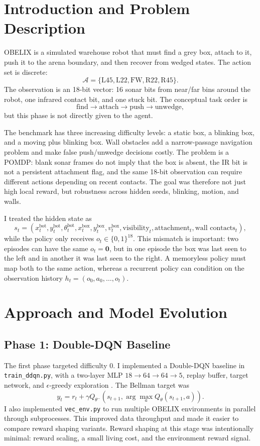 \documentclass[11pt, oneside]{article}
\begin{document}
\section{Introduction and Problem Description}
OBELIX is a simulated warehouse robot that must find a grey box, attach to it, push it to the arena boundary, and then recover from wedged states. The action set is discrete:
\[
\mathcal{A}=\{\text{L45},\text{L22},\text{FW},\text{R22},\text{R45}\}.
\]
The observation is an 18-bit vector: 16 sonar bits from near/far bins around the robot, one infrared contact bit, and one stuck bit. The conceptual task order is
\[
\text{find}\rightarrow \text{attach}\rightarrow \text{push}\rightarrow \text{unwedge},
\]
but this phase is not directly given to the agent.

The benchmark has three increasing difficulty levels: a static box, a blinking box, and a moving plus blinking box. Wall obstacles add a narrow-passage navigation problem and make false push/unwedge decisions costly. The problem is a POMDP: blank sonar frames do not imply that the box is absent, the IR bit is not a persistent attachment flag, and the same 18-bit observation can require different actions depending on recent contacts. The goal was therefore not just high local reward, but robustness across hidden seeds, blinking, motion, and walls.

I treated the hidden state as
\[
s_t=(x_t^{\mathrm{bot}},y_t^{\mathrm{bot}},\theta_t^{\mathrm{bot}},
x_t^{\mathrm{box}},y_t^{\mathrm{box}},v_t^{\mathrm{box}},
\text{visibility}_t,\text{attachment}_t,\text{wall contacts}_t),
\]
while the policy only receives \(o_t\in\{0,1\}^{18}\). This mismatch is important: two episodes can have the same \(o_t=\mathbf{0}\), but in one episode the box was last seen to the left and in another it was last seen to the right. A memoryless policy must map both to the same action, whereas a recurrent policy can condition on the observation history \(h_t=(o_0,a_0,\ldots,o_t)\).

\section{Approach and Model Evolution}
\subsection*{Phase 1: Double-DQN Baseline}
The first phase targeted difficulty 0. I implemented a Double-DQN baseline in \texttt{train\_ddqn.py}, with a two-layer MLP \(18\!\to\!64\!\to\!64\!\to\!5\), replay buffer, target network, and \(\epsilon\)-greedy exploration \citep{mnih2015dqn,vanhasselt2016double}. The Bellman target was
\[
y_t=r_t+\gamma Q_{\theta^-}(s_{t+1},\arg\max_a Q_{\theta}(s_{t+1},a)).
\]
I also implemented \texttt{vec\_env.py} to run multiple OBELIX environments in parallel through subprocesses. This improved data throughput and made it easier to compare reward shaping variants. Reward shaping at this stage was intentionally minimal: reward scaling, a small living cost, and the environment reward signal.
\end{document}
